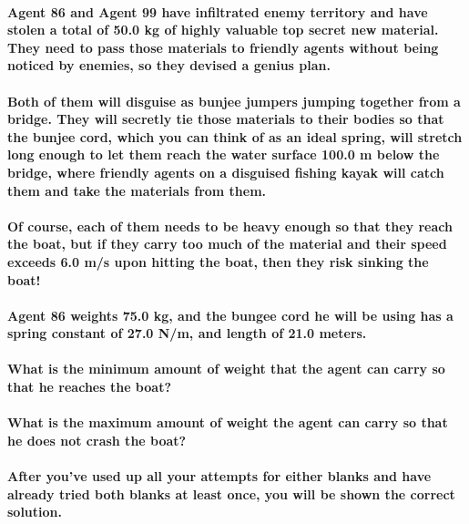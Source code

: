 \paragraph{Agent 86 and Agent 99 have inﬁltrated enemy territory and have stolen a total of 50.0 kg of highly valuable top secret new material. They need to pass those materials to friendly agents without being noticed by enemies, so they devised a genius plan.\newline}
\paragraph{Both of them will disguise as bunjee jumpers jumping together from a bridge. They will secretly tie those materials to their bodies so that the bunjee cord, which you can think of as an ideal spring, will stretch long enough to let them reach the water surface 100.0 m below the bridge, where friendly agents on a disguised ﬁshing kayak will catch them and take the materials from them.\newline}
\paragraph{Of course, each of them needs to be heavy enough so that they reach the boat, but if they carry too much of the material and their speed exceeds 6.0 m/s upon hitting the boat, then they risk sinking the boat!\newline}
\paragraph{Agent 86 weights 75.0 kg, and the bungee cord he will be using has a spring constant of 27.0 N/m, and length of 21.0 meters.\newline}
\paragraph{What is the minimum amount of weight that the agent can carry so that he reaches the boat? \newline}
\paragraph{What is the maximum amount of weight the agent can carry so that he does not crash the boat?\newline}
\paragraph{After you’ve used up all your attempts for either blanks and have already tried both blanks at least once, you will be shown the correct solution. \newline}
